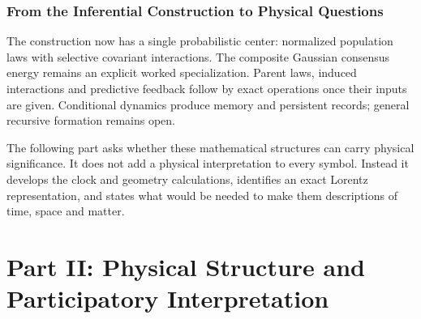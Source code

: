 \section{From the Inferential Construction to Physical Questions}\label{sec:conclusion}

The construction now has a single probabilistic center: normalized population laws with selective covariant interactions. The composite Gaussian consensus energy remains an explicit worked specialization. Parent laws, induced interactions and predictive feedback follow by exact operations once their inputs are given. Conditional dynamics produce memory and persistent records; general recursive formation remains open.

The following part asks whether these mathematical structures can carry physical significance. It does not add a physical interpretation to every symbol. Instead it develops the clock and geometry calculations, identifies an exact Lorentz representation, and states what would be needed to make them descriptions of time, space and matter.

\clearpage
\part*{Part II: Physical Structure and Participatory Interpretation}

